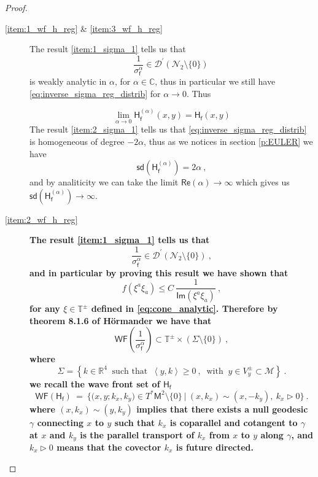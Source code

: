 \documentclass[11pt]{book}
\newcommand{\com}[1]{{\color{red}\bf #1}}
\newcommand{\hilight}[1]{\colorbox{yellow!80!black}{#1}}
\newcommand{\WF}{\mathsf{WF}}
\newcommand{\sd}{\mathsf{sd}}
\renewcommand{\Re}{\mathsf{Re}}
\renewcommand{\Im}{\mathsf{Im}}
\newcommand{\sm}[1]{\left\langle#1\right\rangle}
\newcommand{\Dcal}{\mathcal{D}}
\newcommand{\Mcal}{\mathcal{M}}
\newcommand{\Ncal}{\mathcal{N}}
\newcommand{\Cbb}{\mathbb{C}}
\newcommand{\Rbb}{\mathbb{R}}
\newcommand{\Tbb}{\mathbb{T}}
\newcommand{\Hsf}{\mathsf{H}}
\newcommand{\Msf}{\mathsf{M}}
\newcommand{\fsf}{\mathsf{f}}
\theoremstyle{break}
\begin{document}
\begin{proof}
\begin{description}
\item[\ref{item:1_wf_h_reg} \& \ref{item:3_wf_h_reg}] 
%
The result \ref{item:1_sigma_1} tells us that 
%
\begin{equation*}
\frac{1}{\sigma_\fsf^\alpha} \in \Dcal^\prime(\Ncal_2\setminus\{0\}) \
\label{eq:inverse_sigma_reg_distrib}
\end{equation*}
%
is weakly analytic in $\alpha$, for $\alpha\in\Cbb$, thus in particular we still have \eqref{eq:inverse_sigma_reg_distrib} for $\alpha\to0$. Thus

\begin{equation*}
\lim_{\alpha\to0} \Hsf^{(\alpha)}_\fsf(x,y) = \Hsf_\fsf(x,y) 
\end{equation*}
%
The result \ref{item:2_sigma_1} tells us that \eqref{eq:inverse_sigma_reg_distrib} is homogeneous of degree $-2\alpha$, thus as we notices in section \ref{p:EULER} we have 
%
\begin{equation*}
\sd(\Hsf^{(\alpha)}_\fsf) = 2\alpha \ ,
\end{equation*}
%
and by analiticity we can take the limit \hilight{$\Re(\alpha) \to \infty$ which gives us $\sd(\Hsf^{(\alpha)}_\fsf)\to\infty$.}
%
%
\item[\ref{item:2_wf_h_reg}] 
%
\com{
The result \ref{item:1_sigma_1} tells us that 
%
\begin{equation*}
\frac{1}{\sigma_\fsf^\alpha} \in \Dcal^\prime(\Ncal_2\setminus\{0\}) \ ,
\end{equation*}
%
and in particular by proving this result we have shown that
%
\begin{equation*}
f(\xi^a\xi_{a}) \leq C \ \frac{1}{\Im(\xi^{a}\xi_{a})} \ , 
\end{equation*}
%
for any $\xi \in \Tbb^\pm$ defined in \eqref{eq:cone_analytic}. Therefore by theorem 8.1.6 of Hörmander \cite{hormander_analysis_1990} we have that 
%
\begin{equation*}
\WF\left(\frac{1}{\sigma_\fsf^\alpha}\right) \subset  \Tbb^\pm \times \left( \Sigma \setminus \{0\} \right) \ ,
\end{equation*}
%
where
%
\begin{equation*}
\Sigma = \left\{ k \in \Rbb^4 \ \mbox{ such that } \ \sm{y,k} \geq 0 \ , \ \mbox{ with } \ y \in V^\pm_y \subset \Mcal \right\} \ . 
\end{equation*}
%
we recall the wave front set of $\Hsf_\fsf$
%
\begin{equation*}
\WF(\Hsf_\fsf) \ = \ \bigg\{ \bigg( x, y ; k_x, k_y \bigg) \in T^\ast\Msf^2 \setminus \{0\} \ \bigg| \ (x,k_x) \sim (x,-k_y), \ k_x \triangleright 0 \bigg\} \ .
\end{equation*}
%
where $(x,k_x) \sim (y,k_y)$ implies that there exists a null geodesic $\gamma$ connecting $x$ to $y$ such that $k_x$ is coparallel and cotangent to $\gamma$ at $x$ and $k_y$ is the parallel transport of $k_x$ from $x$ to $y$ along $\gamma$, and  $k_x \triangleright 0$ means that the covector $k_x$ is future directed.

}
\end{description}
\end{proof}
\end{document}
